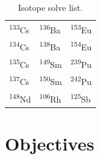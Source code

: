 \documentclass[11pt,notitlepage]{article}
\newcommand{\tss}{\textsuperscript}
\begin{document}
\begin{table}[H]
  \begin{center}
    \caption{Isotope solve list.}
    \label{Table:1}
    \begin{tabular}{l l l}
      \toprule
      \tss{133}Cs & \tss{136}Ba & \tss{153}Eu\\
      \tss{134}Cs & \tss{138}Ba & \tss{154}Eu\\
      \tss{135}Cs & \tss{149}Sm & \tss{239}Pu\\
      \tss{137}Cs & \tss{150}Sm & \tss{242}Pu\\
      \tss{148}Nd & \tss{106}Rh & \tss{125}Sb\\
      \bottomrule
    \end{tabular}
  \end{center}
\end{table}


\section{Objectives}
\end{document}
